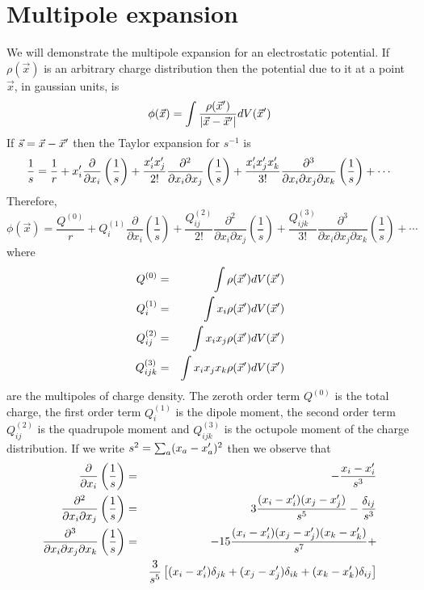 \section{Multipole expansion}\label{c2sa4} 
We will demonstrate the multipole expansion for an electrostatic potential. If $\rho(\vec{x})$ is an arbitrary charge distribution then the potential due to it at a 
point $\vec{x}$, in gaussian units, is
\[
\phi(\vec{x}) = \int\frac{\rho(\vec{x}^\prime)}{|\vec{x} - \vec{x}^\prime|}dV(\vec{x}^\prime)
\]
If $\vec{s} = \vec{x} - \vec{x}^\prime$ then the Taylor expansion for $s^{-1}$ is
\[
\frac{1}{s} = \frac{1}{r} + x_i^\prime\frac{\partial}{\partial x_i}\left(\frac{1}{s}\right) + \frac{x_i^\prime x_j^\prime}{2!}\frac{\partial^2}{\partial x_i \partial x_j}\left(\frac{1}{s}\right)
+ \frac{x_i^\prime x_j^\prime x_k^\prime}{3!} \frac{\partial^3}{\partial x_i \partial x_j \partial x_k}\left(\frac{1}{s}\right) + \cdots
\]
Therefore,
\[
\phi(\vec{x}) = \frac{Q^{(0)}}{r} + Q_i^{(1)}\frac{\partial}{\partial x_i}\left(\frac{1}{s}\right) + 
\frac{Q_{ij}^{(2)}}{2!}\frac{\partial^2}{\partial x_i \partial x_j}\left(\frac{1}{s}\right) +
\frac{Q_{ijk}^{(3)}}{3!}\frac{\partial^3}{\partial x_i \partial x_j \partial x_k}\left(\frac{1}{s}\right) + \cdots
\]
where
\begin{eqnarray*}
Q^{(0)} &=& \int \rho(\vec{x}^\prime)dV(\vec{x}^\prime) \\
Q_i^{(1)} &=& \int x_i \rho(\vec{x}^\prime)dV(\vec{x}^\prime) \\
Q_{ij}^{(2)} &=& \int x_i x_j \rho(\vec{x}^\prime)dV(\vec{x}^\prime) \\
Q_{ijk}^{(3)} &=& \int x_i x_j x_k \rho(\vec{x}^\prime)dV(\vec{x}^\prime) \\
\end{eqnarray*}
are the multipoles of charge density. The zeroth order term $Q^{(0)}$ is the total charge, the first order term $Q_i^{(1)}$ is the dipole moment, the second order term $Q_{ij}^{(2)}$ is 
the quadrupole moment and $Q_{ijk}^{(3)}$ is the octupole moment of the charge distribution. If we write $s^2 = \sum_{a}(x_a - x_a^\prime)^2$ then we observe that
\begin{eqnarray*}
\frac{\partial}{\partial x_i}\left(\frac{1}{s}\right) &=& -\frac{x_i - x_i^\prime}{s^3} \\
\frac{\partial^2}{\partial x_i \partial x_j}\left(\frac{1}{s}\right) &=& 3\frac{(x_i - x_i^\prime)(x_j - x_j^\prime)}{s^5} -\frac{\delta_{ij}}{s^3} \\
\frac{\partial^3}{\partial x_i \partial x_j \partial x_k}\left(\frac{1}{s}\right) &=& -15\frac{(x_i - x_i^\prime)(x_j - x_j^\prime)(x_k - x_k^\prime)}{s^7} + \\
 & & \frac{3}{s^5}\left[(x_i - x_i^\prime)\delta_{jk} + (x_j - x_j^\prime)\delta_{ik} + (x_k - x_k^\prime)\delta_{ij}\right]
\end{eqnarray*}
